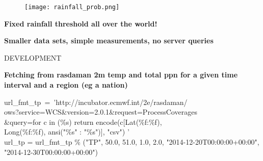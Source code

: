 \documentclass[xcolor=x11names,compress]{beamer}
\renewcommand{\(}{\begin{columns}}
\renewcommand{\)}{\end{columns}}
\newcommand{\<}[1]{\begin{column}{#1}}
\renewcommand{\>}{\end{column}}
\begin{document}
\begin{frame}{}
\large
\begin{figure}\centering
	 \texttt{[image: rainfall\_prob.png]}
\end{figure}
\begin{block}{}
\bf \alert{Fixed} rainfall threshold all over the world!
\end{block}
\end{frame}


\begin{frame}{}
\large
\begin{block}{}
\bf \alert{Smaller} data sets, \alert{simple} measurements, \alert{no} server queries 
\end{block}
\end{frame}


\begin{frame}{DEVELOPMENT}
\large
\begin{block}{}
\bf Fetching from rasdaman 2m temp and total ppn for a given time interval and a region (eg a nation)
\end{block}
\begin{block}{}
 \bf 
\pause
\scriptsize{
\begin{texttt}{url\_fmt\_tp~=~'http://incubator.ecmwf.int/2e/rasdaman/\\ows?service=WCS\&version=2.0.1\&request=ProcessCoverages\\\&query=for c in (\%s) return encode(c[Lat(\%f:\%f),\\ Long(\%f:\%f), ansi("\%s" : "\%s")], "csv") '
\\ \vspace{3mm} url\_tp = url\_fmt\_tp \% ("TP", 50.0, 51.0, 1.0, 2.0, "2014-12-20T00:00:00+00:00", "2014-12-30T00:00:00+00:00")}
\end{texttt}}
\end{block}
\end{frame}
\end{document}
